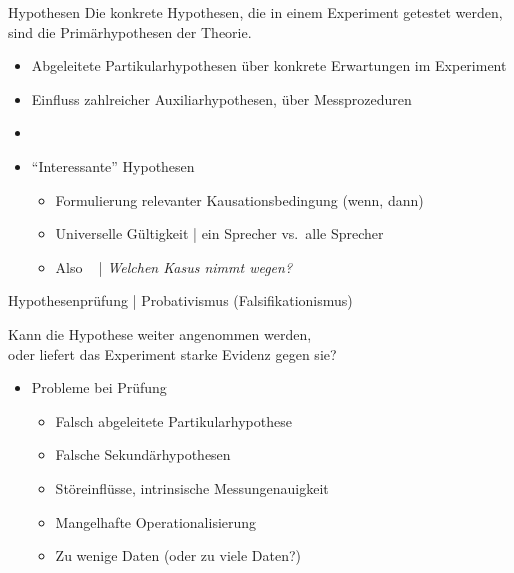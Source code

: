 \begin{frame}
  {Hypothesen}
  Die konkrete Hypothesen, die in einem Experiment getestet werden,\\
  sind  die Primärhypothesen der Theorie.
  \Zeile
  \begin{itemize}[<+->]  
    \item \alert{Abgeleitete Partikularhypothesen} über konkrete Erwartungen im Experiment
    \item Einfluss zahlreicher \alert{Auxiliarhypothesen}, \zB über Messprozeduren
    \item[ ] 
    \Zeile
    \item "`Interessante"' Hypothesen
      \begin{itemize}[<+->]
        \item Formulierung relevanter \alert{Kausationsbedingung} (wenn, dann)
        \item \alert{Universelle Gültigkeit} | ein Sprecher vs.\ alle Sprecher
        \item Also \zB\  | \textit{Welchen Kasus nimmt wegen?}
      \end{itemize}
      \Halbzeile
  \end{itemize}
\end{frame}

\begin{frame}
  {Hypothesenprüfung | Probativismus (Falsifikationismus)}
  \begin{center}
    \alert{Kann die Hypothese weiter angenommen werden,\\
    oder liefert das Experiment starke Evidenz gegen sie?}
  \end{center}
  \Zeile
  \begin{itemize}[<+->]
    \item Probleme bei Prüfung
      \Viertelzeile
      \begin{itemize}[<+->]
        \item Falsch abgeleitete Partikularhypothese
        \item Falsche Sekundärhypothesen
	\item Störeinflüsse, intrinsische Messungenauigkeit
        \item Mangelhafte \alert{Operationalisierung}
	\item Zu wenige Daten (oder zu viele Daten?)
      \end{itemize}
  \end{itemize}
\end{frame}


